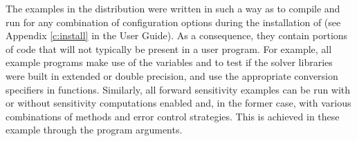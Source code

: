 \vspace{0.2in}
The examples in the {\idas} distribution were written in such a way as
to compile and run for any combination of configuration options during
the installation of {\sundials} (see Appendix \ref{c:install} in the User Guide).
As a consequence, they contain portions of code that will not typically be present in a
user program. For example, all example programs make use of the
variables  and 
to test if the solver libraries
were built in extended or double precision, and use the appropriate conversion 
specifiers in  functions. Similarly, all forward sensitivity
examples can be run with or without sensitivity computations enabled and,
in the former case, with various combinations of methods and error control 
strategies. This is achieved in these example through the program arguments.

